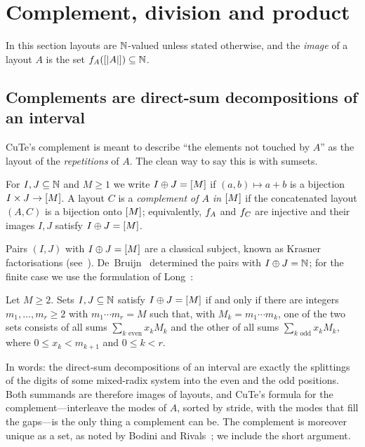 \section{Complement, division and product}\label{sec:complement}

In this section layouts are $\mathbb{N}$-valued unless stated otherwise, and the \emph{image} of a layout
$A$ is the set $f_{A}([|A|])\subseteq\mathbb{N}$.

\subsection{Complements are direct-sum decompositions of an interval}

CuTe's complement is meant to describe ``the elements not touched by $A$'' as the layout of the
\emph{repetitions} of $A$. The clean way to say this is with sumsets.

\begin{definition}\label{def:directsum}
For $I,J\subseteq\mathbb{N}$ and $M\ge1$ we write $I\oplus J=[M]$ if $(a,b)\mapsto a+b$ is a bijection
$I\times J\to[M]$. A layout $C$ is a \emph{complement of $A$ in $[M]$} if the concatenated
layout $(A,C)$ is a bijection onto $[M]$; equivalently, $f_{A}$ and $f_{C}$ are injective and
their images $I,J$ satisfy $I\oplus J=[M]$.
\end{definition}

Pairs $(I,J)$ with $I\oplus J=[M]$ are a classical subject, known as Krasner factorisations
(see~\cite{bodini2006}). De~Bruijn~\cite{debruijn1956} determined the pairs with $I\oplus J=\mathbb{N}$;
for the finite case we use the formulation of Long~\cite{long1967}:

\begin{theorem}\label{thm:long}
Let $M\ge2$. Sets $I,J\subseteq\mathbb{N}$ satisfy $I\oplus J=[M]$ if and only if there are integers
$m_1,\dots,m_r\ge2$ with $m_1\cdots m_r=M$ such that, with $M_k=m_1\cdots m_k$, one of the two
sets consists of all sums $\sum_{k\text{ even}}x_kM_k$ and the other of all sums
$\sum_{k\text{ odd}}x_kM_k$, where $0\le x_k<m_{k+1}$ and $0\le k<r$.
\end{theorem}

\noindent In words: the direct-sum decompositions of an interval are exactly the splittings of the
digits of some mixed-radix system into the even and the odd positions. Both summands are
therefore images of layouts, and CuTe's formula for the complement---interleave the modes of $A$,
sorted by stride, with the modes that fill the gaps---is the only thing a complement can be. The
complement is moreover unique as a set, as noted by Bodini and Rivals~\cite[\S3]{bodini2006}; we
include the short argument.

